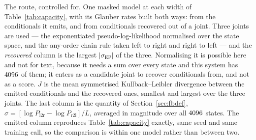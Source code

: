 \documentclass[11pt]{article}
\newcommand{\sigEP}{\sigma_{\mathrm{EP}}}
\begin{document}
\begin{table}[t]
\centering

\caption{The route, controlled for.  One masked model at each width of
Table~\ref{tab:capacity}, with its Glauber rates built both ways: from the
conditionals it emits, and from conditionals recovered out of a joint.  Three
joints are used --- the exponentiated pseudo-log-likelihood normalised over
the state space, and the any-order chain rule taken left to right and right
to left --- and the \emph{recovered} column is the largest $|\sigEP|$ of the
three.  Normalising it is possible here and not for text, because it needs a
sum over every state and this system has $\ToyStates$ of them; it enters as a
candidate joint to recover conditionals from, and not as a score.  $J$ is the
mean symmetrised Kullback--Leibler divergence between the emitted
conditionals and the recovered ones, smallest and largest over the three
joints.  The last column is the quantity of
Section~\ref{sec:fbdef}, $\sigma = [\log P_{\mathrm{l2r}} - \log
P_{\mathrm{r2l}}]/L$, averaged in magnitude over all $\ToyStates$ states.
The emitted column reproduces Table~\ref{tab:capacity} exactly, same seed and
same training call, so the comparison is within one model rather than between
two.}
\label{tab:bayesroute}
\end{table}


\clearpage
\end{document}
